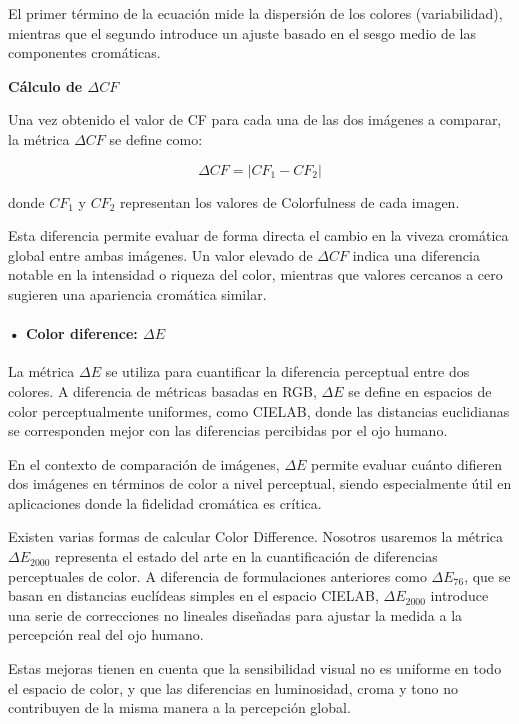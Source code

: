 \documentclass[a4paper]{article}
\begin{document}
El primer término de la ecuación mide la dispersión de los colores (variabilidad), mientras que el segundo introduce un ajuste basado en el sesgo medio de las componentes cromáticas.

\medskip
\textbf{Cálculo de $\Delta CF$}

Una vez obtenido el valor de CF para cada una de las dos imágenes a comparar, la métrica $\Delta CF$ se define como:

\begin{equation}
	\Delta CF = | CF_1 - CF_2 |
\end{equation}

donde $CF_1$ y $CF_2$ representan los valores de Colorfulness de cada imagen.

Esta diferencia permite evaluar de forma directa el cambio en la viveza cromática global entre ambas imágenes. Un valor elevado de $\Delta CF$ indica una diferencia notable en la intensidad o riqueza del color, mientras que valores cercanos a cero sugieren una apariencia cromática similar.

\paragraph{ • Color diference: $\Delta E$ \cite{DeltaE}}


La métrica $\Delta E$ se utiliza para cuantificar la diferencia perceptual entre dos colores. A diferencia de métricas basadas en RGB, $\Delta E$ se define en espacios de color perceptualmente uniformes, como CIELAB, donde las distancias euclidianas se corresponden mejor con las diferencias percibidas por el ojo humano.

En el contexto de comparación de imágenes, $\Delta E$ permite evaluar cuánto difieren dos imágenes en términos de color a nivel perceptual, siendo especialmente útil en aplicaciones donde la fidelidad cromática es crítica.


Existen varias formas de calcular Color Difference. Nosotros usaremos la métrica $\Delta E_{2000}$ representa el estado del arte en la cuantificación de diferencias perceptuales de color. A diferencia de formulaciones anteriores como $\Delta E_{76}$, que se basan en distancias euclídeas simples en el espacio CIELAB, $\Delta E_{2000}$ introduce una serie de correcciones no lineales diseñadas para ajustar la medida a la percepción real del ojo humano.

Estas mejoras tienen en cuenta que la sensibilidad visual no es uniforme en todo el espacio de color, y que las diferencias en luminosidad, croma y tono no contribuyen de la misma manera a la percepción global.
\end{document}
